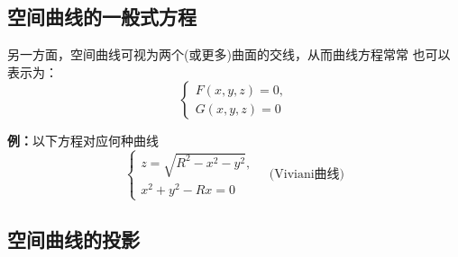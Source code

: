 \subsection{空间曲线的一般式方程}

另一方面，空间曲线可视为两个(或更多)曲面的交线，从而曲线方程常常
也可以表示为：
$${\left\{\begin{array}{l}
	F(x,y,z)=0,\\ G(x,y,z)=0
\end{array}\right.}$$

{\bf 例：}以下方程对应何种曲线
$$\left\{\begin{array}{l}
	z=\sqrt{R^2-x^2-y^2},\\ x^2+y^2-Rx=0
\end{array}\right. \quad{\mbox{(Viviani曲线)}}$$
\begin{center}
\end{center}

\subsection{空间曲线的投影}

